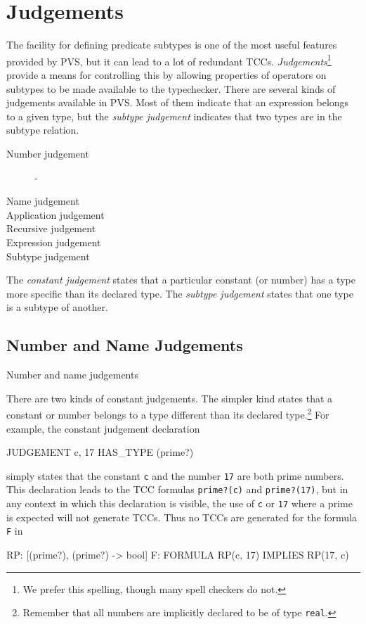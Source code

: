 \section{Judgements}
\label{judgements}

The facility for defining predicate subtypes is one of the most useful
features provided by PVS, but it can lead to a lot of redundant TCCs.
\emph{Judgements}\footnote{We prefer this spelling, though many spell
checkers do not.} provide a means for controlling this by allowing
properties of operators on subtypes to be made available to the
typechecker.  There are several kinds of judgements available in PVS\@. 
Most of them indicate that an expression belongs to a given type, but the
\emph{subtype judgement} indicates that two types are in the subtype
relation.
\begin{description}
\item[Number judgement] - 
\item[Name judgement]
\item[Application judgement]
\item[Recursive judgement]
\item[Expression judgement]
\item[Subtype judgement]
\end{description}


The \emph{constant judgement} states that a
particular constant (or number) has a type more specific than its declared
type.  The \emph{subtype judgement} states that
one type is a subtype of another.

\subsection{Number and Name Judgements}

Number and name judgements 

There are two kinds of constant judgements.  The simpler kind 
states that a constant or number belongs to a type different than its
declared type.\footnote{Remember that all numbers are implicitly declared to
be of type \texttt{real}.}  For example, the constant judgement
declaration
\begin{pvsex}
  JUDGEMENT c, 17 HAS_TYPE (prime?)
\end{pvsex}
simply states that the constant \texttt{c} and the number \texttt{17} are
both prime numbers.  This declaration leads to the TCC formulas
\texttt{prime?(c)} and \texttt{prime?(17)}, but in any context in which
this declaration is visible, the use of \texttt{c} or \texttt{17} where a
prime is expected will not generate TCCs.  Thus no TCCs are generated for
the formula \texttt{F} in
\begin{pvsex}
  RP: [(prime?), (prime?) -> bool]
  F: FORMULA RP(c, 17) IMPLIES RP(17, c)
\end{pvsex}

